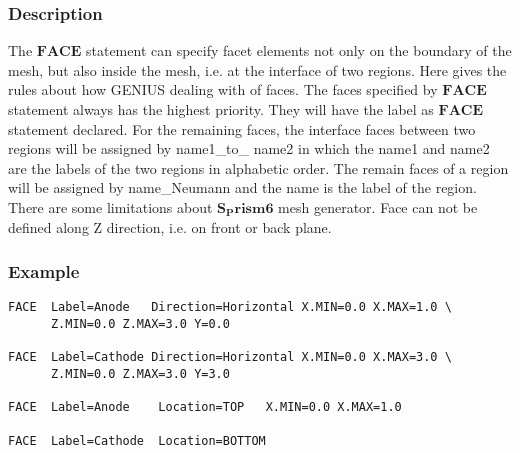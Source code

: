 \documentclass[oneside,12pt]{cgd_book}
\begin{document}
\subsubsection{Description}
The $\mathbf{FACE}$ statement can specify facet elements not only on the boundary of the mesh,
          but also inside the mesh, i.e. at the interface of two regions. Here gives the rules about how GENIUS dealing
          with of faces. The faces specified by $\mathbf{FACE}$ statement always has the highest priority. They
          will have the label as $\mathbf{FACE}$ statement declared. For the remaining faces, the interface
          faces between two regions will be assigned by {\ttsl name1}\_to\_{\ttsl
name2} in which the {\ttsl name1} and {\ttsl name2} are the labels of the two regions in
          alphabetic order. The remain faces of a region will be assigned by
{\ttsl name}\_Neumann and
          the {\ttsl name} is the label of the region. There are some limitations about
$\mathbf{S_Prism6}$ mesh generator. Face can not be defined along Z direction, i.e. on front or
          back plane.
\par
\subsubsection{Example}
\begin{lstlisting}[style=GeniusCode]
FACE  Label=Anode   Direction=Horizontal X.MIN=0.0 X.MAX=1.0 \
      Z.MIN=0.0 Z.MAX=3.0 Y=0.0

FACE  Label=Cathode Direction=Horizontal X.MIN=0.0 X.MAX=3.0 \
      Z.MIN=0.0 Z.MAX=3.0 Y=3.0

FACE  Label=Anode    Location=TOP   X.MIN=0.0 X.MAX=1.0

FACE  Label=Cathode  Location=BOTTOM
\end{lstlisting}
\end{document}
